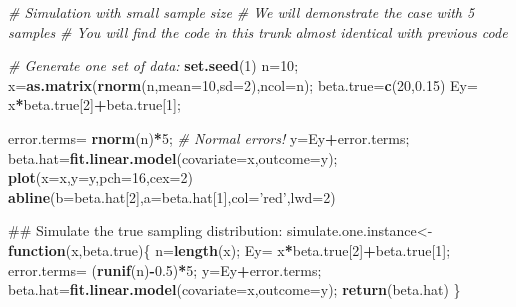 \documentclass[12pt,]{book}
\newenvironment{Shaded}{\begin{snugshade}}{\end{snugshade}}
\newcommand{\KeywordTok}[1]{\textcolor[rgb]{0.13,0.29,0.53}{\textbf{#1}}}
\newcommand{\DataTypeTok}[1]{\textcolor[rgb]{0.13,0.29,0.53}{#1}}
\newcommand{\DecValTok}[1]{\textcolor[rgb]{0.00,0.00,0.81}{#1}}
\newcommand{\FloatTok}[1]{\textcolor[rgb]{0.00,0.00,0.81}{#1}}
\newcommand{\StringTok}[1]{\textcolor[rgb]{0.31,0.60,0.02}{#1}}
\newcommand{\CommentTok}[1]{\textcolor[rgb]{0.56,0.35,0.01}{\textit{#1}}}
\newcommand{\ControlFlowTok}[1]{\textcolor[rgb]{0.13,0.29,0.53}{\textbf{#1}}}
\newcommand{\OperatorTok}[1]{\textcolor[rgb]{0.81,0.36,0.00}{\textbf{#1}}}
\newcommand{\NormalTok}[1]{#1}
\begin{document}
\begin{Shaded}
\begin{Highlighting}[]
\CommentTok{# Simulation with small sample size}
\CommentTok{# We will demonstrate the case with 5 samples}
\CommentTok{# You will find the code in this trunk almost identical with previous code}

\CommentTok{# Generate one set of data:}
\KeywordTok{set.seed}\NormalTok{(}\DecValTok{1}\NormalTok{)}
\NormalTok{n=}\DecValTok{10}\NormalTok{;}
\NormalTok{x=}\KeywordTok{as.matrix}\NormalTok{(}\KeywordTok{rnorm}\NormalTok{(n,}\DataTypeTok{mean=}\DecValTok{10}\NormalTok{,}\DataTypeTok{sd=}\DecValTok{2}\NormalTok{),}\DataTypeTok{ncol=}\NormalTok{n);}
\NormalTok{beta.true=}\KeywordTok{c}\NormalTok{(}\DecValTok{20}\NormalTok{,}\FloatTok{0.15}\NormalTok{)}
\NormalTok{Ey=}\StringTok{ }\NormalTok{x}\OperatorTok{*}\NormalTok{beta.true[}\DecValTok{2}\NormalTok{]}\OperatorTok{+}\NormalTok{beta.true[}\DecValTok{1}\NormalTok{];}

\NormalTok{error.terms=}\StringTok{ }\KeywordTok{rnorm}\NormalTok{(n)}\OperatorTok{*}\DecValTok{5}\NormalTok{; }\CommentTok{# Normal errors!}
\NormalTok{y=Ey}\OperatorTok{+}\NormalTok{error.terms;}
\NormalTok{beta.hat=}\KeywordTok{fit.linear.model}\NormalTok{(}\DataTypeTok{covariate=}\NormalTok{x,}\DataTypeTok{outcome=}\NormalTok{y);}
\KeywordTok{plot}\NormalTok{(}\DataTypeTok{x=}\NormalTok{x,}\DataTypeTok{y=}\NormalTok{y,}\DataTypeTok{pch=}\DecValTok{16}\NormalTok{,}\DataTypeTok{cex=}\DecValTok{2}\NormalTok{)}
\KeywordTok{abline}\NormalTok{(}\DataTypeTok{b=}\NormalTok{beta.hat[}\DecValTok{2}\NormalTok{],}\DataTypeTok{a=}\NormalTok{beta.hat[}\DecValTok{1}\NormalTok{],}\DataTypeTok{col=}\StringTok{'red'}\NormalTok{,}\DataTypeTok{lwd=}\DecValTok{2}\NormalTok{)}


\NormalTok{## Simulate the true sampling distribution:}
\NormalTok{simulate.one.instance<-}\ControlFlowTok{function}\NormalTok{(x,beta.true)\{}
\NormalTok{  n=}\KeywordTok{length}\NormalTok{(x);}
\NormalTok{  Ey=}\StringTok{ }\NormalTok{x}\OperatorTok{*}\NormalTok{beta.true[}\DecValTok{2}\NormalTok{]}\OperatorTok{+}\NormalTok{beta.true[}\DecValTok{1}\NormalTok{];}
\NormalTok{  error.terms=}\StringTok{ }\NormalTok{(}\KeywordTok{runif}\NormalTok{(n)}\OperatorTok{-}\FloatTok{0.5}\NormalTok{)}\OperatorTok{*}\DecValTok{5}\NormalTok{;}
\NormalTok{  y=Ey}\OperatorTok{+}\NormalTok{error.terms;}
\NormalTok{  beta.hat=}\KeywordTok{fit.linear.model}\NormalTok{(}\DataTypeTok{covariate=}\NormalTok{x,}\DataTypeTok{outcome=}\NormalTok{y);}
  \KeywordTok{return}\NormalTok{(beta.hat)}
\NormalTok{\}}


\end{Highlighting}
\end{Shaded}
\end{document}
